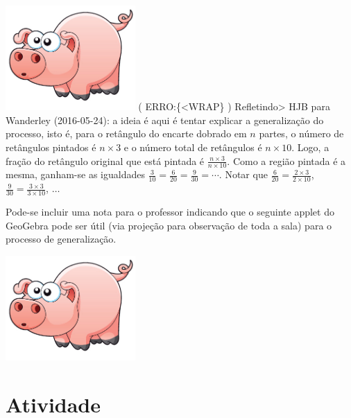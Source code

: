 \documentclass[a4,12pt]{book}
\begin{document}
\includegraphics[width=\textwidth,height=4cm, keepaspectratio]{pig}
( ERRO:\{<WRAP\} ) Refletindo>
HJB para Wanderley (2016-05-24): a ideia é aqui é tentar explicar a generalização do processo, isto é, para o retângulo do encarte dobrado em $n$ partes, o número de retângulos pintados é $n \times 3$ e o número total de retângulos é $n \times 10$. Logo, a fração do retângulo original que está pintada é $ \frac{n \times 3}{n \times 10}$. Como a região pintada é a mesma, ganham-se as igualdades $\frac{3}{10} = \frac{6}{20} = \frac{9}{30} = \cdots$.
Notar que
$\frac{6}{20} = \frac{2 \times 3}{2 \times 10}$,
$\frac{9}{30} = \frac{3 \times 3}{3 \times 10}$, $\ldots$

Pode-se incluir uma nota para o professor indicando que o seguinte applet do GeoGebra pode ser útil (via projeção para observação de toda a sala) para o processo de generalização.



\includegraphics[width=\textwidth,height=4cm, keepaspectratio]{pig}
\section{Atividade}
\end{document}

